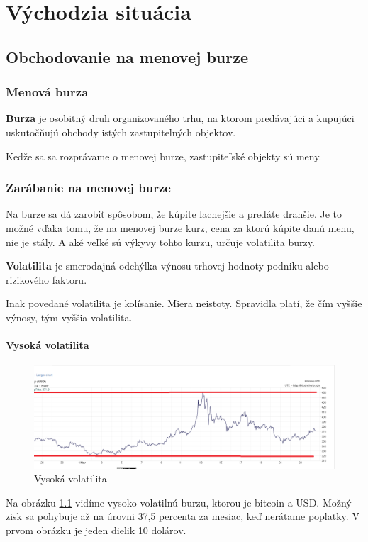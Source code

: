 
\chapter{Východzia situácia}\label{chap:intro} 
\section{Obchodovanie na menovej burze} 
\subsection{Menová burza} 
\begin{mydef} 
{\bf Burza}\cite{ZAC} je osobitný druh organizovaného trhu, na ktorom predávajúci a kupujúci uskutočňujú obchody istých zastupiteľných objektov. 
\end{mydef} 
Kedže sa sa rozprávame o menovej burze, zastupiteľské objekty sú meny. 
\subsection{Zarábanie na menovej burze} 
Na burze sa dá zarobiť spôsobom, že kúpite lacnejšie a predáte drahšie. Je to možné vďaka tomu, že na menovej burze kurz, cena za ktorú kúpite danú menu, nie je stály. A aké veľké sú výkyvy tohto kurzu, určuje volatilita burzy. 
\begin{mydef}
{\bf Volatilita}\cite{vlachy2006vrizeni} je smerodajná odchýlka výnosu trhovej hodnoty podniku alebo rizikového faktoru. 
\end{mydef} 
Inak povedané volatilita je kolísanie. Miera neistoty. Spravidla platí, že čím vyššie výnosy, tým vyššia volatilita. 
\subsubsection{Vysoká volatilita} 
\begin{figure}[!hbt] 
\begin{center} 
\includegraphics[width=1\textwidth]{obr} 
\caption{Vysoká volatilita} 
\label{img:vvolat} 
\end{center} 
\end{figure} 
\begin{myex}
Na obrázku \ref{img:vvolat}  vidíme vysoko volatilnú burzu, ktorou je bitcoin a USD. Možný zisk sa pohybuje až na úrovni 37,5 percenta za mesiac, keď nerátame poplatky. V prvom obrázku je jeden dielik 10 dolárov.  
\end{myex}
